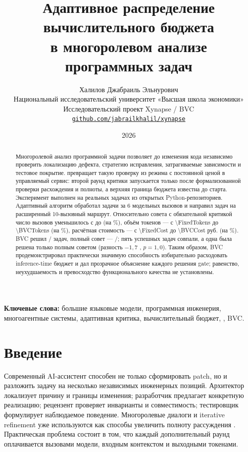 \documentclass[11pt]{article}
\title{\vspace{-1.2em}\textbf{\sffamily Адаптивное распределение вычислительного бюджета\\
в многоролевом анализе программных задач}}
\author{Халилов Джабраиль Эльнурович\\
\small Национальный исследовательский университет «Высшая школа экономики»\\
\small Исследовательский проект Xynapse / BVC\\
\small \href{https://github.com/jabrailkhalil/xynapse}{\nolinkurl{github.com/jabrailkhalil/xynapse}}}
\date{2026}
\begin{document}
\maketitle

\begin{abstract}
Многоролевой анализ программной задачи позволяет до изменения кода независимо
проверить локализацию дефекта, стратегию исправления, затрагиваемые зависимости
и тестовое покрытие. \BVCname{} превращает такую проверку из режима с постоянной
ценой в управляемый сервис: второй раунд критики запускается только после
формализованной проверки расхождения и полноты, а верхняя граница бюджета
известна до старта.
Эксперимент выполнен на \NTasks{} реальных задачах \dataset{} из \NRepos{}
открытых Python-репозиториев. Адаптивный алгоритм обработал \BVCShort{} задачи
за 6 модельных вызовов и направил \BVCExtended{} задач на расширенный
10-вызовный маршрут. Относительно совета с обязательной критикой число вызовов
уменьшилось с \FixedCalls{} до \BVCCalls{} (на \CallsSavedPct\%), объём
токенов --- с \num{\FixedTokens} до \num{\BVCTokens} (на
\TokensSavedPct\%), расчётная стоимость --- с \num{\FixedCost} до
\num{\BVCCost} руб. (на \CostSavedPct\%). BVC решил \BVCResolved{}/\NTasks{}
задач, полный совет --- \FixedResolved{}/\NTasks{}; пять успешных задач
совпали, а одна была решена только полным советом
(разность \(-1{,}7\) \pp, \(p=1{,}0\)). Таким образом, BVC продемонстрировал
практически значимую способность избирательно расходовать inference-time
бюджет и дал прозрачное объяснение каждого решения gate; равенство,
неухудшаемость и превосходство функционального качества не установлены.
\end{abstract}

\noindent\textbf{Ключевые слова:} большие языковые модели, программная
инженерия, многоагентные системы, адаптивная критика, вычислительный бюджет,
\dataset{}, BVC.

\section{Введение}

Современный AI-ассистент способен не только сформировать patch, но и разложить
задачу на несколько независимых инженерных позиций. Архитектор локализует
причину и границы изменения; разработчик предлагает конкретную реализацию;
рецензент проверяет инварианты и совместимость; тестировщик формулирует
наблюдаемое поведение. Многоролевые диалоги и iterative refinement уже
используются как способы увеличить полноту рассуждения
\cite{wu2023autogen,du2023debate,shinn2023reflexion,madaan2023selfrefine}.
Практическая проблема состоит в том, что каждый дополнительный раунд оплачивается
вызовами модели, входным контекстом и выходными токенами.
\end{document}
